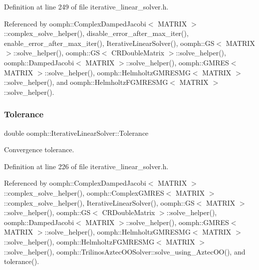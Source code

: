 Definition at line 249 of file iterative\+\_\+linear\+\_\+solver.\+h.



Referenced by oomph\+::\+Complex\+Damped\+Jacobi$<$ M\+A\+T\+R\+I\+X $>$\+::complex\+\_\+solve\+\_\+helper(), disable\+\_\+error\+\_\+after\+\_\+max\+\_\+iter(), enable\+\_\+error\+\_\+after\+\_\+max\+\_\+iter(), Iterative\+Linear\+Solver(), oomph\+::\+G\+S$<$ M\+A\+T\+R\+I\+X $>$\+::solve\+\_\+helper(), oomph\+::\+G\+S$<$ C\+R\+Double\+Matrix $>$\+::solve\+\_\+helper(), oomph\+::\+Damped\+Jacobi$<$ M\+A\+T\+R\+I\+X $>$\+::solve\+\_\+helper(), oomph\+::\+G\+M\+R\+E\+S$<$ M\+A\+T\+R\+I\+X $>$\+::solve\+\_\+helper(), oomph\+::\+Helmholtz\+G\+M\+R\+E\+S\+M\+G$<$ M\+A\+T\+R\+I\+X $>$\+::solve\+\_\+helper(), and oomph\+::\+Helmholtz\+F\+G\+M\+R\+E\+S\+M\+G$<$ M\+A\+T\+R\+I\+X $>$\+::solve\+\_\+helper().

\mbox{\label{classoomph_1_1IterativeLinearSolver_a46dd6b0243c734a77afce3c44cf4597d}} 
\subsubsection{\texorpdfstring{Tolerance}{Tolerance}}
{\footnotesize\ttfamily double oomph\+::\+Iterative\+Linear\+Solver\+::\+Tolerance\hspace{0.3cm}{\ttfamily [protected]}}



Convergence tolerance. 



Definition at line 226 of file iterative\+\_\+linear\+\_\+solver.\+h.



Referenced by oomph\+::\+Complex\+Damped\+Jacobi$<$ M\+A\+T\+R\+I\+X $>$\+::complex\+\_\+solve\+\_\+helper(), oomph\+::\+Complex\+G\+M\+R\+E\+S$<$ M\+A\+T\+R\+I\+X $>$\+::complex\+\_\+solve\+\_\+helper(), Iterative\+Linear\+Solver(), oomph\+::\+G\+S$<$ M\+A\+T\+R\+I\+X $>$\+::solve\+\_\+helper(), oomph\+::\+G\+S$<$ C\+R\+Double\+Matrix $>$\+::solve\+\_\+helper(), oomph\+::\+Damped\+Jacobi$<$ M\+A\+T\+R\+I\+X $>$\+::solve\+\_\+helper(), oomph\+::\+G\+M\+R\+E\+S$<$ M\+A\+T\+R\+I\+X $>$\+::solve\+\_\+helper(), oomph\+::\+Helmholtz\+G\+M\+R\+E\+S\+M\+G$<$ M\+A\+T\+R\+I\+X $>$\+::solve\+\_\+helper(), oomph\+::\+Helmholtz\+F\+G\+M\+R\+E\+S\+M\+G$<$ M\+A\+T\+R\+I\+X $>$\+::solve\+\_\+helper(), oomph\+::\+Trilinos\+Aztec\+O\+O\+Solver\+::solve\+\_\+using\+\_\+\+Aztec\+O\+O(), and tolerance().

